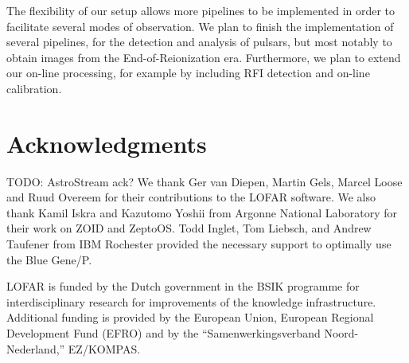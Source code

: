 \documentclass[10pt]{article}
\begin{document}
The flexibility of our setup allows more pipelines to be implemented in order to facilitate several
modes of observation. We plan to finish the implementation of several pipelines, for the detection
and analysis of pulsars, but most notably to obtain images from the End-of-Reionization era. Furthermore,
we plan to extend our on-line processing, for example by including RFI detection and on-line calibration.



\section*{Acknowledgments}

TODO: AstroStream ack?
We thank Ger van Diepen, Martin Gels, Marcel Loose and Ruud Overeem
for their contributions to the LOFAR software.
We also thank Kamil Iskra and Kazutomo Yoshii from Argonne National Laboratory
for their work on ZOID and ZeptoOS.
Todd Inglet, Tom Liebsch, and Andrew Taufener from IBM Rochester provided the
necessary support to optimally use the Blue Gene/P.

LOFAR is funded by the Dutch government in the BSIK programme for
interdisciplinary research for improvements of the knowledge infrastructure.
Additional funding is provided by the European Union, European Regional
Development Fund (EFRO) and by the ``Samenwerkingsverband Noord-Nederland,''
EZ/KOMPAS.



\end{document}
